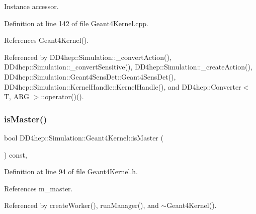 Instance accessor. 



Definition at line 142 of file Geant4\+Kernel.\+cpp.



References Geant4\+Kernel().



Referenced by D\+D4hep\+::\+Simulation\+::\+\_\+convert\+Action(), D\+D4hep\+::\+Simulation\+::\+\_\+convert\+Sensitive(), D\+D4hep\+::\+Simulation\+::\+\_\+create\+Action(), D\+D4hep\+::\+Simulation\+::\+Geant4\+Sens\+Det\+::\+Geant4\+Sens\+Det(), D\+D4hep\+::\+Simulation\+::\+Kernel\+Handle\+::\+Kernel\+Handle(), and D\+D4hep\+::\+Converter$<$ T, A\+R\+G $>$\+::operator()().

\hypertarget{class_d_d4hep_1_1_simulation_1_1_geant4_kernel_a7913e7e64c2adfdc06339feab56e606f}{}\label{class_d_d4hep_1_1_simulation_1_1_geant4_kernel_a7913e7e64c2adfdc06339feab56e606f} 
\subsubsection{\texorpdfstring{is\+Master()}{isMaster()}}
{\footnotesize\ttfamily bool D\+D4hep\+::\+Simulation\+::\+Geant4\+Kernel\+::is\+Master (\begin{DoxyParamCaption}{ }\end{DoxyParamCaption}) const\hspace{0.3cm}{\ttfamily [inline]}, {\ttfamily [protected]}}



Definition at line 94 of file Geant4\+Kernel.\+h.



References m\+\_\+master.



Referenced by create\+Worker(), run\+Manager(), and $\sim$\+Geant4\+Kernel().

\hypertarget{class_d_d4hep_1_1_simulation_1_1_geant4_kernel_a7bd105526c0873bd9b24d3de41052d88}{}\label{class_d_d4hep_1_1_simulation_1_1_geant4_kernel_a7bd105526c0873bd9b24d3de41052d88} 
